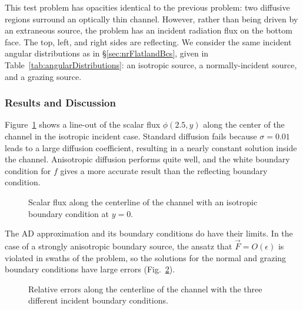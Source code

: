 This test problem has opacities identical to the previous problem: two diffusive
regions surround an optically thin channel. However, rather than being driven
by an extraneous source, the problem has an incident radiation flux on the
bottom face. The top, left, and right sides are reflecting. We consider the same
incident angular distributions as in \S\ref{sec:nrFlatlandBcs}, given in
Table~\ref{tab:angularDistributions}: an isotropic
source, a normally-incident source, and a grazing source.

\subsubsection{Results and Discussion}

Figure~\ref{fig:adbcIsotropic} shows a line-out of the scalar flux $\phi(2.5,y)$
along the center of the channel in the isotropic incident case. Standard
diffusion fails because $\sigma=0.01$ leads to a
large diffusion coefficient, resulting in a nearly constant solution inside the
channel. Anisotropic diffusion performs quite well, and the
white boundary condition for $f$ gives a more accurate result than the
reflecting boundary condition.

\begin{figure}[htb]
  \centering
  \centering\small
  \hspace{-.25in}%
  
  \caption{Scalar flux along the centerline of the channel with an isotropic
  boundary condition at $y=0$.}
  \label{fig:adbcIsotropic}
\end{figure}

The AD approximation and its boundary conditions do have their limits. In the
case of a strongly anisotropic boundary source, the ansatz that
$\vec{F} = O(\epsilon)$ is violated in swaths of the problem, so the solutions
for the normal and grazing boundary conditions have large errors
(Fig.~\ref{fig:adbcRelErr}).

\begin{figure}[htb]
  \centering
  \centering\small
  \hspace{-.25in}%
  
  \caption{Relative errors along the centerline of the channel with the three
  different incident boundary conditions.}
  \label{fig:adbcRelErr}
\end{figure}

